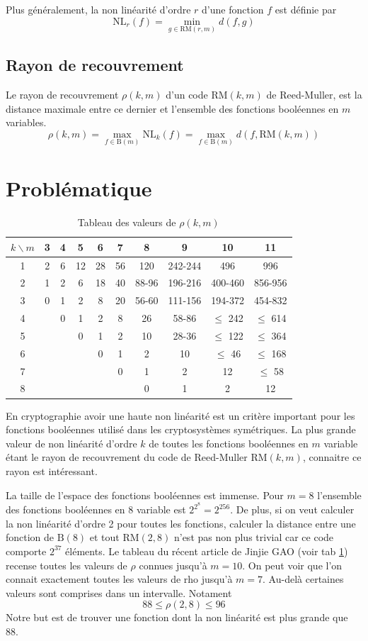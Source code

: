\documentclass{article}
\def\RM#1#2{\ensuremath{\mathrm{RM}(#1, #2)}}
\def\BM{\ensuremath{\mathrm{B}(m)}}
\begin{document}
Plus généralement, la non linéarité d'ordre $r$ d'une fonction $f$ est définie par
$$
\mathrm{NL}_r(f) = \min_{g \in \RM{r}{m}} d(f,g)
$$
\subsection{Rayon de recouvrement}
Le rayon de recouvrement $\rho(k, m)$ d'un code $\mathrm{RM}(k, m)$ de Reed-Muller, est la distance maximale entre ce dernier et l'ensemble des fonctions booléennes
en $m$ variables.
$$ \rho(k, m) = \max_{f \in \BM} \mathrm{NL}_k(f) =  \max_{f \in \mathrm{B}(m)} d(f, \RM{k}{m}) $$


\section{Problématique}
\begin{table}
	\center
	\caption{Tableau des valeurs de $\rho(k,m)$}
	\label{tab:tab_rho}
	\begin{tabular}{c|ccccccccc}
		$k\backslash m$ & 3 & 4 & 5 & 6 & 7 & 8 & 9 & 10 & 11 \\
		\hline
		1 & 2 & 6 & 12 & 28 & 56 & 120 & 242-244 & 496 & 996 \\
		2 & 1 & 2 & 6 & 18 & 40 & 88-96 & 196-216 & 400-460 & 856-956 \\
		3 & 0 & 1 & 2 & 8 & 20 & 56-60 & 111-156 & 194-372 & 454-832 \\
		4 &  & 0 & 1 & 2 & 8 & 26 & 58-86 & $\leq$ 242 & $\leq$ 614 \\
		5 &  &  & 0 & 1 & 2 & 10 & 28-36 & $\leq$ 122 & $\leq$ 364 \\
		6 &  &  &  & 0 & 1 & 2 & 10 & $\leq$ 46 & $\leq$ 168 \\
		7 &  &  &  &  & 0 & 1 & 2 & 12 & $\leq$ 58 \\
		8 &  &  &  &  &  & 0 & 1 & 2 & 12 \\
		\hline
	\end{tabular}
\end{table}

En cryptographie avoir une haute non linéarité est un critère important pour les fonctions booléennes utilisé dans les cryptosystèmes symétriques. La plus grande valeur de non linéarité d'ordre $k$
de toutes les fonctions booléennes en $m$ variable étant le rayon de recouvrement du code de Reed-Muller $\RM{k}{m}$, connaitre ce rayon est intéressant.

La taille de l'espace des fonctions booléennes est immense. Pour $m=8$ l'ensemble des fonctions booléennes en 8 variable est $2^{2^8} = 2^{256}$.
De plus, si on veut calculer la non linéarité d'ordre 2 pour toutes les fonctions, calculer la distance entre une fonction de $\mathrm{B}(8)$ et tout \RM{2}{8} n'est pas non plus trivial
car ce code comporte $2^{37}$ éléments.
Le tableau du récent article de Jinjie GAO \cite{gao2026} (voir tab \ref{tab:tab_rho}) recense toutes les valeurs de $\rho$ connues jusqu'à $m=10$. On peut voir que l'on connait exactement toutes les valeurs de rho jusqu'à $m=7$. Au-delà certaines valeurs sont comprises dans un
intervalle. Notament
$$88 \leq \rho(2, 8) \leq 96$$
Notre but est de trouver une fonction dont la non linéarité est plus grande que 88.
\end{document}
